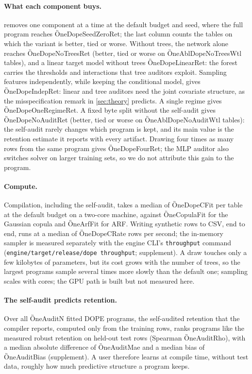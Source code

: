 \paragraph{What each component buys.}
 removes one component at a time at the default budget and seed, where the full
program reaches \G{OneDopeSeedZeroRet}; the last column counts the tables on which the variant is better,
tied or worse. Without trees, the network alone reaches \G{OneDopeNoTreesRet} (better, tied or worse on
\G{OneAblDopeNoTreesWtl} tables), and a linear target
model without trees \G{OneDopeLinearRet}: the forest carries the thresholds and interactions that tree
auditors exploit. Sampling features independently, while keeping the conditional model, gives
\G{OneDopeIndepRet}: linear and tree auditors need the joint covariate structure, as the
misspecification remark in \cref{sec:theory} predicts. A single regime gives \G{OneDopeOneRegimeRet}.
A fixed byte split without the self-audit gives \G{OneDopeNoAuditRet} (better, tied or worse on
\G{OneAblDopeNoAuditWtl} tables): the self-audit rarely changes which program is kept, and its main
value is the retention estimate it reports with every artifact. Drawing four times as many rows
from the same program gives \G{OneDopeFourRet}; the MLP auditor also switches solver on larger training
sets, so we do not attribute this gain to the program.

\paragraph{Compute.}
Compilation, including the self-audit, takes a median of \G{OneDopeCFit} per table at the default
budget on a two-core machine, against \G{OneCopulaFit} for the Gaussian copula and \G{OneArfFit}
for ARF. Writing synthetic rows to CSV, end to end, runs at a median of \G{OneDopeCRate} rows per
second; the in-memory sampler is measured separately with the engine CLI's \texttt{throughput} command
(\texttt{engine/target/release/dope throughput}; supplement).
A draw touches only a few kilobytes of parameters, but its cost grows with the number of trees, so
the largest programs sample several times more slowly than the default one; sampling scales with
cores; the GPU path is built but not measured here.

\paragraph{The self-audit predicts retention.}
Over all \G{OneAuditN} fitted DOPE programs, the self-audited retention that the compiler reports,
computed only from the training rows, ranks programs like the measured robust retention on held-out
test rows (Spearman \G{OneAuditRho}), with a median absolute difference of \G{OneAuditMae} and a
median bias of \G{OneAuditBias} (supplement). A user therefore learns at compile time, without
test data, roughly how much predictive structure a program keeps.

